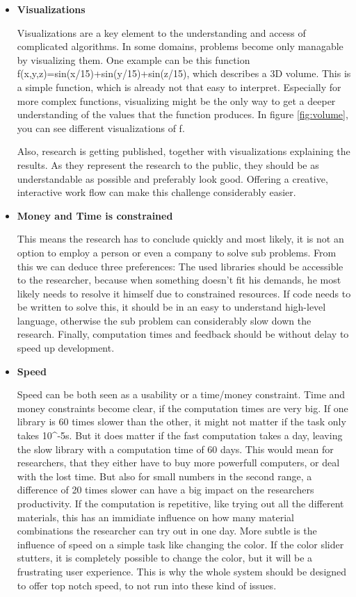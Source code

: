 \begin{itemize} 

    \item  \textbf{Visualizations}

    Visualizations are a key element to the understanding and access of complicated algorithms.
    In some domains, problems become only managable by visualizing them. 
    One example can be this function f(x,y,z)=sin(x/15)+sin(y/15)+sin(z/15), which describes a 3D volume. 
    This is a simple function, which is already not that easy to interpret. Especially for more complex functions, visualizing might be the only way to get a deeper understanding of the values that the function produces. In figure \ref{fig:volume}, you can see different visualizations of f.

    Also, research is getting published, together with visualizations explaining the results. As they represent the research to the public, they should be as understandable as possible and preferably look good.
    Offering a creative, interactive work flow can make this challenge considerably easier.


    \item \textbf{Money and Time is constrained}
    
    This means the research has to conclude quickly and most likely, it is not an option to employ a person or even a company to solve sub problems.
    From this we can deduce three preferences: 
    The used libraries should be accessible to the researcher, because when something doesn't fit his demands, he most likely needs to resolve it himself due to constrained resources.
    If code needs to be written to solve this, it should be in an easy to understand high-level language, otherwise the sub problem can considerably slow down the research.
    Finally, computation times and feedback should be without delay to speed up development. 

    \item \textbf{Speed}
    
    Speed can be both seen as a usability or a time/money constraint. 
    Time and money constraints become clear, if the computation times are very big. If one library is 60 times slower than the other, it might not matter if the task only takes 10^-5s. But it does matter if the fast computation takes a day, leaving the slow library with a computation time of 60 days.
    This would mean for researchers, that they either have to buy more powerfull computers, or deal with the lost time.
    But also for small numbers in the second range, a difference of 20 times slower can have a big impact on the researchers productivity. If the computation is repetitive, like trying out all the different materials, this has an immidiate influence on how many material combinations the researcher can try out in one day.
    More subtle is the influence of speed on a simple task like changing the color. If the color slider stutters, it is completely possible to change the color, but it will be a frustrating user experience. 
    This is why the whole system should be designed to offer top notch speed, to not run into these kind of issues.

\end{itemize} 


